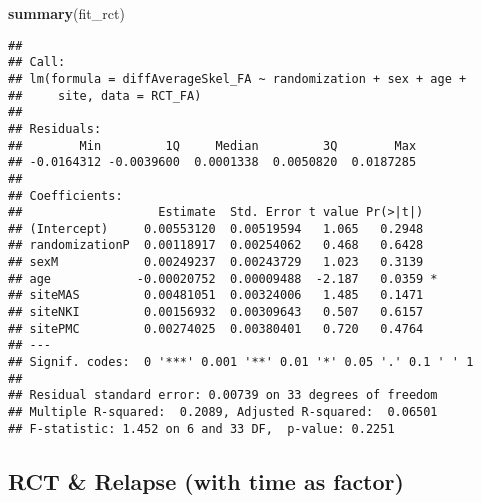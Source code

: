 \documentclass[]{article}
\newenvironment{Shaded}{\begin{snugshade}}{\end{snugshade}}
\newcommand{\KeywordTok}[1]{\textcolor[rgb]{0.13,0.29,0.53}{\textbf{#1}}}
\newcommand{\NormalTok}[1]{#1}
\theoremstyle{definition}
\theoremstyle{definition}
\theoremstyle{definition}
\theoremstyle{remark}
\begin{document}
\begin{Shaded}
\begin{Highlighting}[]
\KeywordTok{summary}\NormalTok{(fit_rct)}
\end{Highlighting}
\end{Shaded}

\begin{verbatim}
## 
## Call:
## lm(formula = diffAverageSkel_FA ~ randomization + sex + age + 
##     site, data = RCT_FA)
## 
## Residuals:
##        Min         1Q     Median         3Q        Max 
## -0.0164312 -0.0039600  0.0001338  0.0050820  0.0187285 
## 
## Coefficients:
##                   Estimate  Std. Error t value Pr(>|t|)  
## (Intercept)     0.00553120  0.00519594   1.065   0.2948  
## randomizationP  0.00118917  0.00254062   0.468   0.6428  
## sexM            0.00249237  0.00243729   1.023   0.3139  
## age            -0.00020752  0.00009488  -2.187   0.0359 *
## siteMAS         0.00481051  0.00324006   1.485   0.1471  
## siteNKI         0.00156932  0.00309643   0.507   0.6157  
## sitePMC         0.00274025  0.00380401   0.720   0.4764  
## ---
## Signif. codes:  0 '***' 0.001 '**' 0.01 '*' 0.05 '.' 0.1 ' ' 1
## 
## Residual standard error: 0.00739 on 33 degrees of freedom
## Multiple R-squared:  0.2089, Adjusted R-squared:  0.06501 
## F-statistic: 1.452 on 6 and 33 DF,  p-value: 0.2251
\end{verbatim}

\subsection{RCT \& Relapse (with time as
factor)}\label{rct-relapse-with-time-as-factor-2}
\end{document}
